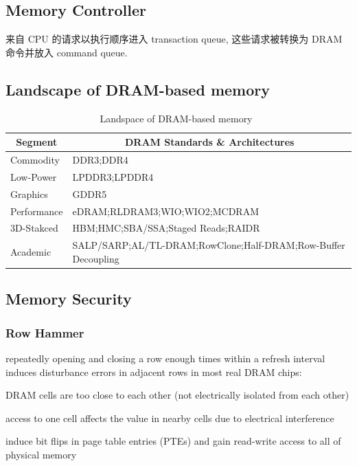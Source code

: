 \documentclass[UTF8,12pt,a4paper]{article}
\begin{document}
\subsection{Memory Controller}
来自 CPU 的请求以执行顺序进入 transaction queue,
这些请求被转换为 DRAM 命令并放入 command queue.

\subsection{Landscape of DRAM-based memory}
\begin{table}
  \begin{small}
    \caption{Landspace of DRAM-based memory~\cite{DBLP:journals/cal/KimYM16}}
    \label{tab:memory_landscape}
    \begin{center}
      \begin{tabular}[c]{l|l}
        \hline
        \multicolumn{1}{c|}{\textbf{Segment}} & 
        \multicolumn{1}{c}{\textbf{DRAM Standards \& Architectures}} \\
        \hline
        Commodity & DDR3;DDR4 \\
        Low-Power & LPDDR3;LPDDR4 \\
        Graphics & GDDR5 \\
        Performance & eDRAM;RLDRAM3;WIO;WIO2;MCDRAM \\
        3D-Stakced & HBM;HMC;SBA/SSA;Staged Reads;RAIDR \\
        Academic & SALP/SARP;AL/TL-DRAM;RowClone;Half-DRAM;Row-Buffer Decoupling \\
        \hline
      \end{tabular}
    \end{center}
  \end{small}
\end{table}

\subsection{Memory Security}
\subsubsection{Row Hammer}
repeatedly opening and closing a row enough times within a refresh interval
induces disturbance errors in adjacent rows in most real DRAM chips:
\begin{compactitem}
  \item DRAM cells are too close to each other (not electrically isolated from each other)
  \item access to one cell affects the value in nearby cells due to electrical interference
  \item induce bit flips in page table entries (PTEs) and gain read-write access to all of physical memory
\end{compactitem}
\end{document}
